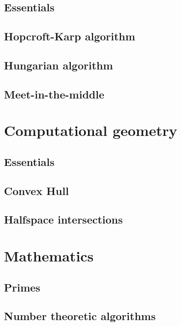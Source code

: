 \documentclass[a4paper]{article}
\newcommand{\includesnippet}[2]{

}
\begin{document}
    \subsection{Essentials}
  
    \subsection{Hopcroft-Karp algorithm}
    
    \subsection{Hungarian algorithm}
    
    \subsection{Meet-in-the-middle}
    
  \section{Computational geometry}
    
    \subsection{Essentials}
    \includesnippet{snippets/geometryessentials.cpp}{C++}
    
    \subsection{Convex Hull}
    \includesnippet{snippets/convexhull.cpp}{C++}
    
    \subsection{Halfspace intersections}
    
  \section{Mathematics}
    
    \subsection{Primes}
    \includesnippet{snippets/primes.cpp}{C++}
    
    \subsection{Number theoretic algorithms}
    \includesnippet{snippets/numbertheory.cpp}{C++}
    
\end{document}
